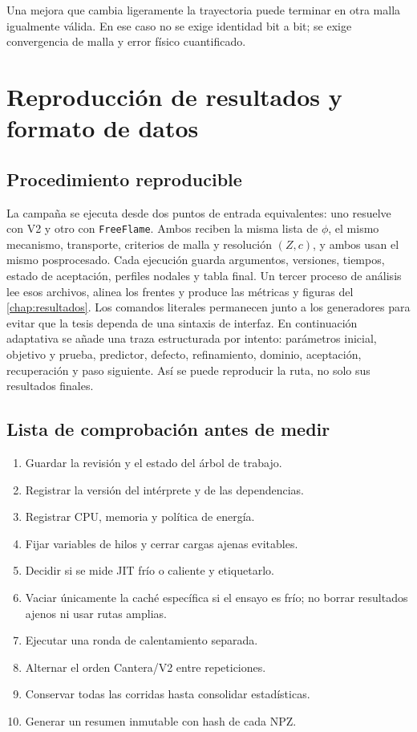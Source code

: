 \documentclass[12pt,a4paper,twoside,openany]{book}
\newcommand{\codigo}[1]{\texttt{#1}}
\begin{document}
Una mejora que cambia ligeramente la trayectoria puede terminar en otra malla
igualmente válida. En ese caso no se exige identidad bit a bit; se exige
convergencia de malla y error físico cuantificado.

\chapter{Reproducción de resultados y formato de datos}
\label{app:reproducibilidad}

\section{Procedimiento reproducible}

La campaña se ejecuta desde dos puntos de entrada equivalentes: uno resuelve con
V2 y otro con \codigo{FreeFlame}. Ambos reciben la misma lista de \(\phi\), el
mismo mecanismo, transporte, criterios de malla y resolución \((Z,c)\), y ambos
usan el mismo posprocesado. Cada ejecución guarda argumentos, versiones, tiempos,
estado de aceptación, perfiles nodales y tabla final. Un tercer proceso de
análisis lee esos archivos, alinea los frentes y produce las métricas y figuras
del \cref{chap:resultados}. Los comandos literales permanecen junto a los
generadores para evitar que la tesis dependa de una sintaxis de interfaz. En
continuación adaptativa se añade una traza estructurada por intento: parámetros
inicial, objetivo y prueba, predictor, defecto, refinamiento, dominio,
aceptación, recuperación y paso siguiente. Así se puede reproducir la ruta, no
solo sus resultados finales.

\section{Lista de comprobación antes de medir}

\begin{enumerate}
  \item Guardar la revisión y el estado del árbol de trabajo.
  \item Registrar la versión del intérprete y de las dependencias.
  \item Registrar CPU, memoria y política de energía.
  \item Fijar variables de hilos y cerrar cargas ajenas evitables.
  \item Decidir si se mide JIT frío o caliente y etiquetarlo.
  \item Vaciar únicamente la caché específica si el ensayo es frío; no borrar
        resultados ajenos ni usar rutas amplias.
  \item Ejecutar una ronda de calentamiento separada.
  \item Alternar el orden Cantera/V2 entre repeticiones.
  \item Conservar todas las corridas hasta consolidar estadísticas.
  \item Generar un resumen inmutable con hash de cada NPZ.
\end{enumerate}
\end{document}
